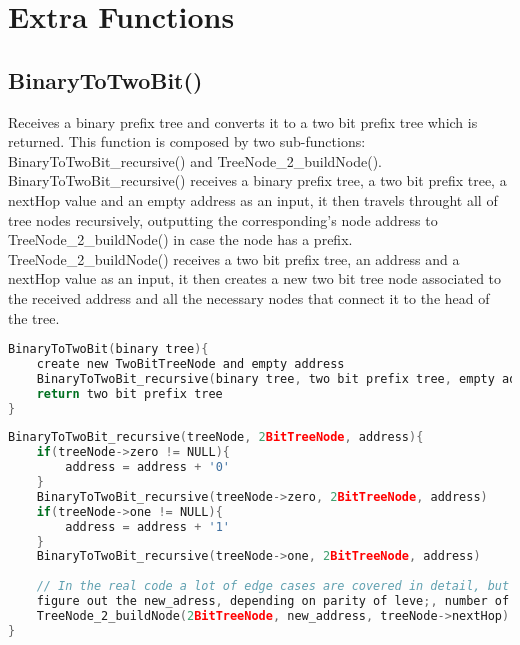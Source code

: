 \documentclass[a4paper]{article}
\begin{document}
\section{Extra Functions}

\subsection{BinaryToTwoBit()}

Receives a binary prefix tree and converts it to a two bit prefix tree which is returned.
This function is composed by two sub-functions: BinaryToTwoBit\_recursive() and TreeNode\_2\_buildNode().\\

BinaryToTwoBit\_recursive() receives a binary prefix tree, a two bit prefix tree, a nextHop value and an empty address as an input, it then travels throught all of tree nodes recursively, outputting the corresponding's node address to TreeNode\_2\_buildNode() in case the node has a prefix.\\

TreeNode\_2\_buildNode() receives a two bit prefix tree, an address and a nextHop value as an input, it then creates a new two bit tree node associated to the received address and all the necessary nodes that connect it to the head of the tree.
\clearpage
\begin{lstlisting}[language=c]
BinaryToTwoBit(binary tree){
    create new TwoBitTreeNode and empty address
    BinaryToTwoBit_recursive(binary tree, two bit prefix tree, empty address)
    return two bit prefix tree
}
\end{lstlisting}

\begin{lstlisting}[language=c]
BinaryToTwoBit_recursive(treeNode, 2BitTreeNode, address){
    if(treeNode->zero != NULL){
        address = address + '0'
    }
    BinaryToTwoBit_recursive(treeNode->zero, 2BitTreeNode, address)
    if(treeNode->one != NULL){
        address = address + '1'
    }
    BinaryToTwoBit_recursive(treeNode->one, 2BitTreeNode, address)
    
    // In the real code a lot of edge cases are covered in detail, but to here we need to simplify the code after the recursive calls in order to keep the report short:
    figure out the new_adress, depending on parity of leve;, number of children..., then:
    TreeNode_2_buildNode(2BitTreeNode, new_address, treeNode->nextHop)
}
\end{lstlisting}
\end{document}
